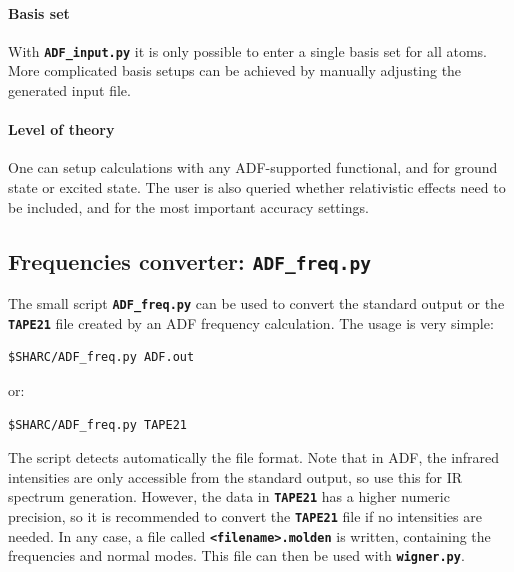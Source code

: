 \documentclass[a4paper,10pt,DIV=15,openany]{scrbook}
\newcommand{\ttt}[1]{\textbf{\texttt{#1}}}
\newenvironment{example}{
  \setlength{\OuterFrameSep}{3pt}
  \vspace{0mm}
  \definecolor{shadecolor}{HTML}{E4F4FF}
  \begin{shaded}
}{
  \end{shaded}
}
\begin{document}
\paragraph{Basis set}

With \ttt{ADF\_input.py} it is only possible to enter a single basis set for all atoms. More complicated basis setups can be achieved by manually adjusting the generated input file.

\paragraph{Level of theory}

One can setup calculations with any ADF-supported functional, and for ground state or excited state. The user is also queried whether relativistic effects need to be included, and for the most important accuracy settings.

% 
% 



\subsection{Frequencies converter: \ttt{ADF\_freq.py}}\label{sec:ADF_freq.py}

The small script \ttt{ADF\_freq.py} can be used to convert the standard output or the \ttt{TAPE21} file created by an ADF frequency calculation.
The usage is very simple:
\begin{example}
  \begin{verbatim}
$SHARC/ADF_freq.py ADF.out
\end{verbatim}
\end{example}
or:
\begin{example}
  \begin{verbatim}
$SHARC/ADF_freq.py TAPE21
\end{verbatim}
\end{example}
The script detects automatically the file format.
Note that in ADF, the infrared intensities are only accessible from the standard output, so use this for IR spectrum generation.
However, the data in \ttt{TAPE21} has a higher numeric precision, so it is recommended to convert the \ttt{TAPE21} file if no intensities are needed.
In any case, a file called \ttt{<filename>.molden} is written, containing the frequencies and normal modes.
This file can then be used with \ttt{wigner.py}.
\end{document}
